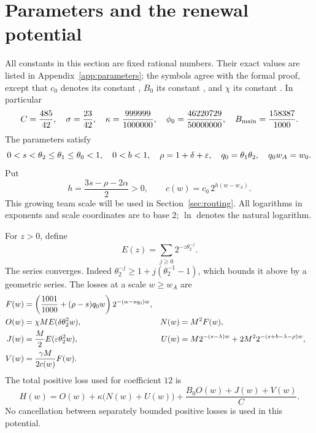 \section{Parameters and the renewal potential}\label{sec:potential}
All constants in this section are fixed rational numbers. Their exact values
are listed in Appendix~\ref{app:parameters}; the symbols agree with the
formal proof, except that $c_0$ denotes its constant , $B_0$ its
constant , and $\chi$ its constant .
In particular
\[
 C=\frac{485}{42},\quad \sigma=\frac{23}{42},\quad
 \kappa=\frac{999999}{1000000},\quad
 \phi_0=\frac{46220729}{50000000},\quad
 B_{\rm main}=\frac{158387}{1000}.
\]
The parameters satisfy
\begin{equation}\label{eq:parameter-order}
 0<s<\theta_2\le\theta_1\le\theta_0<1,\quad 0<b<1,\quad
 \rho=1+\delta+\varepsilon,\quad q_0=\theta_1\theta_2,\quad q_0w_A=w_0.
\end{equation}
Put
\[
 h=\frac{3s-\rho-2\alpha}{2}>0,
 \qquad c(w)=c_0\,2^{h(w-w_A)}.
\]
This growing team scale will be used in Section~\ref{sec:routing}.
All logarithms in exponents and scale coordinates are to base $2$;
$\ln$ denotes the natural logarithm.

For $z>0$, define
\begin{equation}\label{eq:scale-series}
 E(z)=\sum_{j\ge0}2^{-z\theta_2^{-j}}.
\end{equation}
The series converges. Indeed
$\theta_2^{-j}\ge1+j(\theta_2^{-1}-1)$, which bounds it above by a
geometric series. The losses at a scale $w\ge w_A$ are
\begin{align}
 F(w)&=\left(\frac{1001}{1000}+(\rho-s)q_0w\right)
                   2^{-(\alpha-sq_0)w},\label{eq:F}\\
 O(w)&=\chi M E(\delta\theta_2^2w),&
 N(w)&=M^2F(w),\label{eq:ON}\\
 J(w)&=\frac M2 E(\varepsilon\theta_2^2w),&
 U(w)&=M2^{-(s-\lambda)w}+2M^2 2^{-(s+b-\lambda-\rho)w},\label{eq:JU}\\
 V(w)&=\frac{\gamma M}{2c(w)}F(w).\label{eq:V}
\end{align}
The total positive loss used for coefficient $12$ is
\begin{equation}\label{eq:H}
 H(w)=O(w)+\kappa\bigl(N(w)+U(w)\bigr)
                   +\frac{B_0O(w)+J(w)+V(w)}C.
\end{equation}
No cancellation between separately bounded positive losses is used in this
potential.

